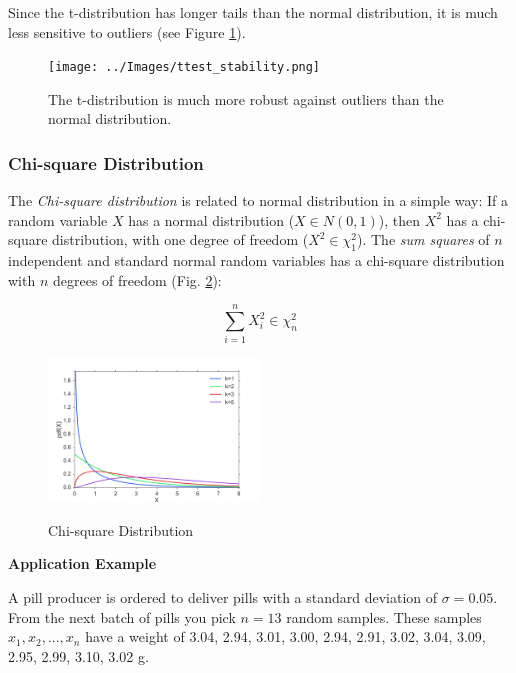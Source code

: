 Since the t-distribution has longer tails than the normal distribution, it is much less sensitive to outliers (see Figure \ref{fig:ttest_stability}).

\begin{figure}
  \centering
  \texttt{[image: ../Images/ttest\_stability.png]}\\
  \caption{The t-distribution is much more robust against outliers than the normal distribution.}\label{fig:ttest_stability}
\end{figure}


\subsubsection{Chi-square Distribution}

The \emph{Chi-square distribution} is related to normal distribution in a simple way: If a random variable $X$ has a normal distribution ($X \in N(0,1)$), then $X^2$ has a chi-square distribution, with one degree of freedom ($X^2 \in \chi_{1}^2$). The \emph{sum squares }of $n$ independent and standard normal random variables has a chi-square distribution with $n$ degrees of freedom (Fig. \ref{fig:chi2}):

\begin{equation}
    \sum\limits_{i = 1}^n {X_i^2} \in \chi_{n}^2
\end{equation}


\begin{figure}
  \centering
  \includegraphics[width=0.5\textwidth]{../Images/dist_chi2.png}\\
  \caption{Chi-square Distribution}
  \label{fig:chi2}
\end{figure}

\textbf{Application Example}

A pill producer is ordered to deliver pills with a standard deviation of $\sigma=0.05$. From the next batch of pills you pick $n=13$ random samples. These samples $x_1, x_2, . . . , x_n$ have a weight of
3.04, 2.94, 3.01, 3.00, 2.94, 2.91, 3.02, 3.04, 3.09, 2.95, 2.99, 3.10, 3.02 g.

